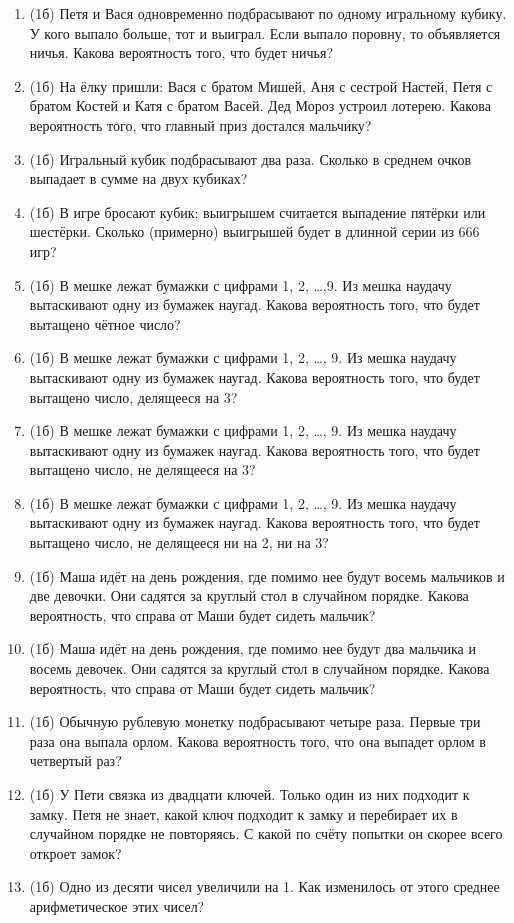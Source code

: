 \documentclass[a4paper, 12pt]{article}
\begin{document}

\begin{enumerate}
\item (1б) Петя и Вася одновременно подбрасывают по одному игральному кубику. У кого выпало больше, тот и выиграл. Если выпало поровну, то объявляется ничья. Какова вероятность того, что будет ничья?
\item (1б) На ёлку пришли: Вася с братом Мишей, Аня с сестрой Настей, Петя с братом Костей и Катя с братом Васей. Дед Мороз устроил лотерею. Какова вероятность того, что главный приз достался мальчику?
\item (1б) Игральный кубик подбрасывают два раза. Сколько в среднем очков выпадает в сумме на двух кубиках?
\item (1б) В игре бросают кубик; выигрышем считается выпадение пятёрки или шестёрки. Сколько (примерно) выигрышей будет в длинной серии из 666 игр?
\item (1б) В мешке лежат бумажки с цифрами 1, 2, \ldots ,9. Из мешка наудачу вытаскивают одну из бумажек наугад. Какова вероятность того, что будет вытащено чётное число?
\item (1б) В мешке лежат бумажки с цифрами 1, 2, \ldots, 9. Из мешка наудачу вытаскивают одну из бумажек наугад. Какова вероятность того, что будет вытащено число, делящееся на 3?
\item (1б) В мешке лежат бумажки с цифрами 1, 2, \ldots, 9. Из мешка наудачу вытаскивают одну из бумажек наугад. Какова вероятность того, что будет вытащено число, не делящееся на 3?
\item (1б) В мешке лежат бумажки с цифрами 1, 2, \ldots, 9. Из мешка наудачу вытаскивают одну из бумажек наугад. Какова вероятность того, что будет вытащено число, не делящееся ни на 2, ни на 3?
\item (1б) Маша идёт на день рождения, где помимо нее будут восемь мальчиков и две девочки. Они садятся за круглый стол в случайном порядке. Какова вероятность, что справа от Маши будет сидеть мальчик? 
\item (1б) Маша идёт на день рождения, где помимо нее будут два мальчика и восемь девочек. Они садятся за круглый стол в случайном порядке. Какова вероятность, что справа от Маши будет сидеть мальчик? 
\item (1б) Обычную рублевую монетку подбрасывают четыре раза. Первые три раза она выпала орлом. Какова вероятность того, что она выпадет орлом в четвертый раз?
\item (1б) У Пети связка из двадцати ключей. Только один из них подходит к замку. Петя не знает, какой ключ подходит к замку и перебирает их в случайном порядке не повторяясь. 
С какой по счёту попытки он скорее всего откроет замок? 
\item (1б) Одно из десяти чисел увеличили на 1. Как изменилось от этого среднее арифметическое этих чисел?
\end{enumerate}
\end{document}

